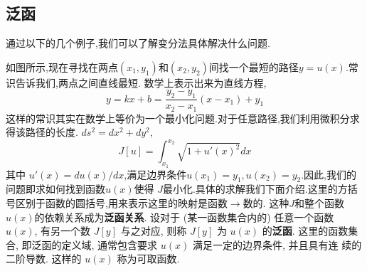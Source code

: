 \subsection{泛函}
\label{subsec:functional}
通过以下的几个例子,我们可以了解变分法具体解决什么问题.

如图所示,现在寻找在两点$(x_1, y_1)$和$(x_2,y_2)$间找一个最短的路径$y=u(x)$.常识告诉我们,两点之间直线最短.
数学上表示出来为直线方程,
$$
  y = k x + b = \frac{y_2 - y_1}{x_2 - x_1} ( x - x_1) + y_1  
$$
这样的常识其实在数学上等价为一个最小化问题.对于任意路径,我们利用微积分求得该路径的长度.
$ds^2 = dx^2 + dy^2$,
$$
J[u] = \int_{x_1}^{x_2} \sqrt{ 1 + u'(x)^2} dx    
$$
其中 $u'(x) = du(x)/dx$,满足边界条件$u(x_1) = y_1, u(x_2) = y_2$.因此,我们的问题即求如何找到函数$u(x)$使得
$J$最小化.具体的求解我们下面介绍.这里的方括号区别于函数的圆括号,用来表示这里的映射是函数$\to$数的.
这种$J$和整个函数$u(x)$的依赖关系成为\textbf{泛函关系}.
设对于 (某一函数集合内的) 任意一个函数 $u(x)$, 
有另一个数 $J[y]$ 与之对应, 则称 $J[y]$ 为 $u(x)$ 的\textbf{泛函}. 
这里的函数集合, 即泛函的定义域, 通常包含要求 $u(x)$ 满足一定的边界条件,
并且具有连 续的二阶导数. 这样的 $u(x)$ 称为可取函数. 


